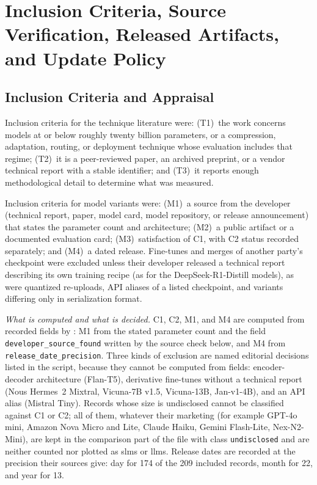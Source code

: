 
\section{Inclusion Criteria, Source Verification, Released Artifacts, and Update Policy}
\label{supp:method}

\subsection{Inclusion Criteria and Appraisal}
\label{subsubsec:intro_screening}

Inclusion criteria for the technique literature were: (T1)~the work concerns models at or below roughly twenty billion parameters, or a compression, adaptation, routing, or deployment technique whose evaluation includes that regime; (T2)~it is a peer-reviewed paper, an archived preprint, or a vendor technical report with a stable identifier; and (T3)~it reports enough methodological detail to determine what was measured.

Inclusion criteria for model variants were: (M1)~a source from the developer (technical report, paper, model card, model repository, or release announcement) that states the parameter count and architecture; (M2)~a public artifact or a documented evaluation card; (M3)~satisfaction of C1, with C2 status recorded separately; and (M4)~a dated release. Fine-tunes and merges of another party's checkpoint were excluded unless their developer released a technical report describing its own training recipe (as for the DeepSeek-R1-Distill models), as were quantized re-uploads, API aliases of a listed checkpoint, and variants differing only in serialization format.

\emph{What is computed and what is decided.} C1, C2, M1, and M4 are computed from recorded fields by : M1 from the stated parameter count and the field \texttt{developer\_source\_found} written by the source check below, and M4 from \texttt{release\_date\_precision}. Three kinds of exclusion are named editorial decisions listed in the script, because they cannot be computed from fields: encoder-decoder architecture (Flan-T5), derivative fine-tunes without a technical report (Nous Hermes~2 Mixtral, Vicuna-7B v1.5, Vicuna-13B, Jan-v1-4B), and an API alias (Mistral Tiny). Records whose size is undisclosed cannot be classified against C1 or C2; all of them, whatever their marketing (for example GPT-4o mini, Amazon Nova Micro and Lite, Claude Haiku, Gemini Flash-Lite, Nex-N2-Mini), are kept in the comparison part of the file with class \texttt{undisclosed} and are neither counted nor plotted as \glspl{slm} or \glspl{llm}. Release dates are recorded at the precision their sources give: day for 174 of the 209 included records, month for 22, and year for 13.


